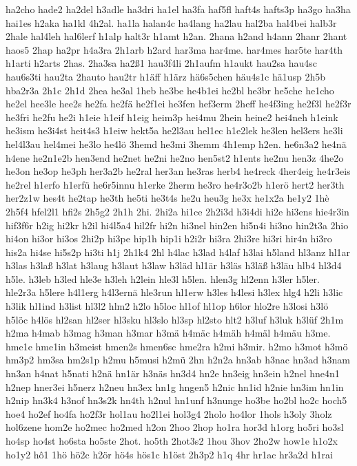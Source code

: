 {ha2cho
hade2
ha2del
h3adle
ha3dri
ha1el
ha3fa
haf5fl
haft4s
hafts3p
ha3go
ha3ha
hai1es
h2aka
ha1kl
4h2al.
ha1la
halan4c
ha4lang
ha2lau
hal2ba
hal4bei
halb3r
2hale
hal4leh
hal6lerf
h1alp
halt3r
h1amt
h2an.
2hana
h2and
h4ann
2hanr
2hant
haos5
2hap
ha2pr
h4a3ra
2h1arb
h2ard
har3ma
har4me.
har4mes
har5te
har4th
h1arti
h2arts
2has.
2ha3sa
ha2ß1
hau3f4li
2h1aufm
h1aukt
hau2sa
hau4sc
hau6s3ti
hau2ta
2hauto
hau2tr
h1äff
h1ärz
hä6s5chen
häu4s1c
hä1usp
2h5b
hba2r3a
2h1c
2h1d
2hea
he3al
1heb
he3be
he4b1ei
he2bl
he3br
he5che
he1cho
he2el
hee3le
hee2s
he2fa
he2fä
he2f1ei
he3fen
hef3erm
2heff
he4f3ing
he2f3l
he2f3r
he3fri
he2fu
he2i
h1eie
h1eif
h1eig
heim3p
hei4mu
2hein
heine2
hei4neh
h1eink
he3ism
he3i4st
heit4s3
h1eiw
hekt5a
he2l3au
hel1ec
h1e2lek
he3len
hel3ers
he3li
hel4l3au
hel4mei
he3lo
he4lö
3hemd
he3mi
3hemm
4h1emp
h2en.
he6n3a2
he4nä
h4ene
he2n1e2b
hen3end
he2net
he2ni
he2no
hen5st2
h1ents
he2nu
hen3z
4he2o
he3on
he3op
he3ph
her3a2b
he2ral
her3an
he3ras
herb4
he4reck
4her4eig
he4r3eis
he2rel
h1erfo
h1erfü
he6r5innu
h1erke
2herm
he3ro
he4r3o2b
h1erö
hert2
her3th
her2z1w
hes4t
he2tap
he3th
he5ti
he3t4s
he2u
heu3g
he3x
he1x2a
he1y2
1hè
2h5f4
hfel2l1
hfi2s
2h5g2
2h1h
2hi.
2hi2a
hi1ce
2h2i3d
h3i4di
hi2e
hi3ens
hie4r3in
hif3f6r
h2ig
hi2kr
h2il
hi4l5a4
hil2fr
hi2n
hi3nel
hin2en
hi5n4i
hi3no
hin2t3a
2hio
hi4on
hi3or
hi3os
2hi2p
hi3pe
hip1h
hip1i
h2i2r
hi3ra
2hi3re
hi3ri
hir4n
hi3ro
his2a
hi4se
hi5s2p
hi3ti
h1j
2h1k4
2hl
h4lac
h3lad
h4laf
h3lai
h5land
hl3anz
hl1ar
h3las
h3laß
h3lat
h3laug
h3laut
h3law
h3läd
hl1är
h3läs
h3läß
h3läu
hlb4
hl3d4
h5le.
h3leb
h3led
hle3e
h3leh
h2lein
hle3l
h5len.
hlen3g
hl2enn
h3ler
h5ler.
hle2r3a
h5lere
h4l1erg
h4l3ernä
hle3run
hl1erw
h3les
h4lesi
h3lex
hlg4
h2li
h3lic
h3lik
hl1ind
h3list
hl3l2
hlm2
h2lo
h5loc
hl1of
hl1op
h6lor
hlo2re
h3losi
h3lö
h5löc
h4lös
hl2san
hl2ser
hl3sku
hl3slo
hl3sp
hl2sto
hlt2
h3luf
h3luk
h3lüf
2h1m
h2ma
h4mab
h3mag
h3man
h3mar
h3mä
h4mäc
h4mäh
h4mäl
h4mäu
h3me.
hme1e
hme1in
h3meist
hmen2s
hmen6sc
hme2ra
h2mi
h3mir.
h2mo
h3mot
h3mö
hm3p2
hm3sa
hm2s1p
h2mu
h5musi
h2mü
2hn
h2n2a
hn3ab
h3nac
hn3ad
h3nam
hn3an
h4nat
h5nati
h2nä
hn1är
h3näs
hn3d4
hn2e
hn3eig
hn3ein
h2nel
hne4n1
h2nep
hner3ei
h5nerz
h2neu
hn3ex
hn1g
hngen5
h2nic
hn1id
h2nie
hn3im
hn1in
h2nip
hn3k4
h3nof
hn3s2k
hn4th
h2nul
hn1unf
h3nunge
ho3be
ho2bl
ho2c
hoch5
hoe4
ho2ef
ho4fa
ho2f3r
hol1au
ho2l1ei
hol3g4
2holo
ho4lor
1hols
h3oly
3holz
hol6zene
hom2e
ho2mec
ho2med
h2on
2hoo
2hop
ho1ra
hor3d
h1org
ho5ri
ho3sl
ho4sp
ho4st
ho6sta
ho5ste
2hot.
ho5th
2hot3s2
1hou
3hov
2ho2w
how1e
h1o2x
ho1y2
hô1
1hö
hö2c
h2ör
hö4s
hös1c
h1öst
2h3p2
h1q
4hr
hr1ac
hr3a2d
h1rai
}
